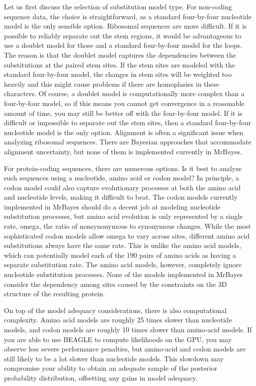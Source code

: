 \documentclass[12pt]{book}
\begin{document}
Let us first discuss the selection of substitution model type. For non-coding sequence data, the choice is
straightforward, as a standard
four-by-four nucleotide model is the only sensible option. Ribosomal sequences are more difficult. If it
is possible to reliably separate out the stem regions, it would be advantageous to use a doublet model for
those and a standard four-by-four model for the loops. The reason is that the doublet model captures the
dependencies between the substitutions at the paired stem sites. If the stem sites are modeled with the
standard four-by-four model, the changes in stem sites will be weighted too heavily and this might cause
problems if there are homoplasies in these characters. Of course, a doublet model is computationally more
complex than a four-by-four model, so if this means you cannot get convergence in a reasonable amount
of time, you may still be better off with the four-by-four model. If it is difficult or impossible to separate out
the stem sites, then a standard four-by-four nucleotide model is the only option. Alignment is often a significant
issue when analyzing ribosomal sequences. There are Bayesian approaches that accommodate alignment
uncertainty, but none of them is implemented currently in MrBayes.

For protein-coding sequences, there are numerous options. Is it best to analyze such sequences using
a nucleotide, amino acid or codon model? In principle, a codon model could also capture evolutionary
processes at both the amino acid and nucleotide levels, making it difficult to beat. The codon models
currently implemented in MrBayes should do a decent job at modeling nucleotide substitution processes,
but amino acid evolution is only represented by a single rate, omega, the ratio of nonsynonymous to
synonymous changes. While the most sophisticated codon models allow omega to vary across sites,
different amino acid substitutions always have the same rate. This is unlike the amino acid models,
which can potentially model each of the 190 pairs of amino acids as having a separate substitution
rate. The amino acid models, however, completely ignore nucleotide substitution processes. None
of the models implemented in MrBayes consider the dependency among sites caused by the constraints
on the 3D structure of the resulting protein.

On top of the model adequacy considerations, there is also computational complexity. Amino acid models are
roughly 25 times slower than nucleotide models, and codon models are roughly 10 times slower
than amino-acid models. If you are able to use BEAGLE to compute likelihoods on the GPU, you
may observe less severe performance penalties, but amino-acid and codon models are still likely
to be a lot slower than nucleotide models. This slowdown may compromise your ability to obtain
an adequate sample of the posterior probability distribution, offsetting any gains in model adequacy.
\end{document}
